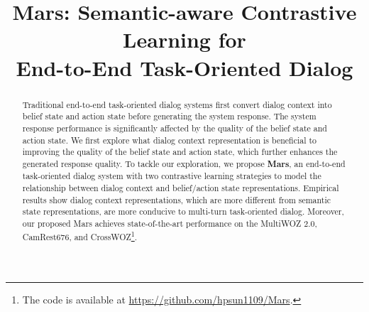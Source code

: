 \title{Mars: Semantic-aware Contrastive Learning for \\ End-to-End Task-Oriented Dialog}



\maketitle
\begin{abstract} 
Traditional end-to-end task-oriented dialog systems first convert dialog context into belief state and action state before generating the system response. The  system response performance is significantly affected by the quality of the belief state and action state. We first explore what dialog context representation is beneficial to improving the quality of the belief state and action state, which further enhances  the generated response quality. To tackle our exploration, we propose \textbf{Mars}, an end-to-end task-oriented dialog system with two contrastive learning strategies to model the relationship between dialog context and  belief/action state representations. Empirical results  show  dialog context representations, which are more different from semantic state representations, are more conducive to multi-turn task-oriented dialog.
Moreover, our proposed  Mars achieves state-of-the-art  performance on the MultiWOZ 2.0, CamRest676, and CrossWOZ\footnote{The code is available at \url{https://github.com/hpsun1109/Mars}.}.
\end{abstract}

